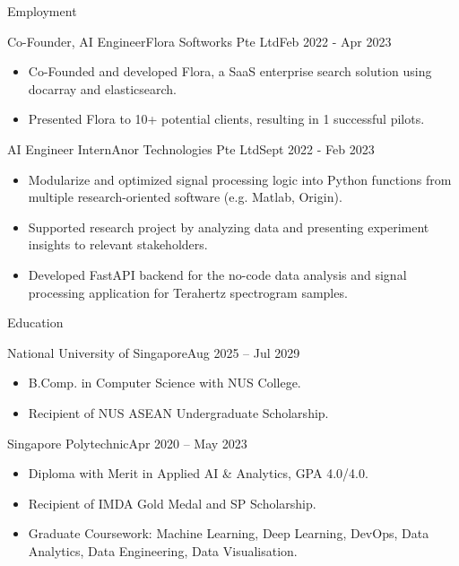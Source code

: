 \documentclass[]{mcdowellcv}
\begin{document}
	\makeheader
	

	\begin{cvsection}{Employment}
		\begin{cvsubsection}{Co-Founder, AI Engineer}{Flora Softworks Pte Ltd}{Feb 2022 - Apr 2023}
			\begin{itemize}
            \item Co-Founded and developed Flora, a SaaS enterprise search solution using docarray and elasticsearch.
			\item Presented Flora to 10+ potential clients, resulting in 1 successful pilots.
			\end{itemize}
		\end{cvsubsection}

		\begin{cvsubsection}{AI Engineer Intern}{Anor Technologies Pte Ltd}{Sept 2022 - Feb 2023}	
			\begin{itemize}
				\item Modularize and optimized signal processing logic into Python functions from multiple research-oriented software (e.g. Matlab, Origin).
				\item Supported research project by analyzing data and presenting experiment insights to relevant stakeholders.
				\item Developed FastAPI backend for the no-code data analysis and signal processing application for Terahertz spectrogram samples.
			\end{itemize}
		\end{cvsubsection}
	\end{cvsection}
	
	\begin{cvsection}{Education}
		\begin{cvsubsection}{National University of Singapore}{}{Aug 2025 -- Jul 2029}
			\begin{itemize}
				\item B.Comp. in Computer Science with NUS College.
				\item Recipient of NUS ASEAN Undergraduate Scholarship.
			\end{itemize}
		\end{cvsubsection}
		\begin{cvsubsection}{Singapore Polytechnic}{}{Apr 2020 -- May 2023}
			\begin{itemize}
				\item Diploma with Merit in Applied AI \& Analytics, GPA 4.0/4.0.
				\item Recipient of IMDA Gold Medal and SP Scholarship.
				\item Graduate Coursework: Machine Learning, Deep Learning, DevOps, Data Analytics, Data Engineering, Data Visualisation.
			\end{itemize}
		\end{cvsubsection}
	\end{cvsection}
		
\end{document}
